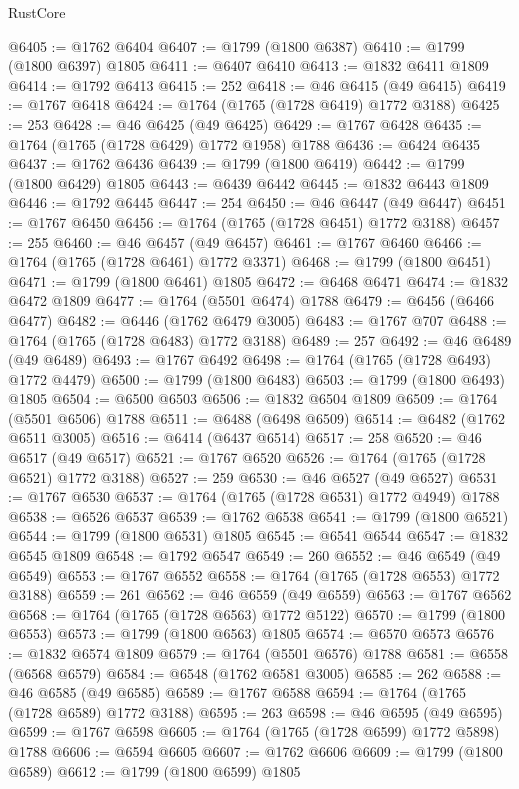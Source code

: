 \begin{lexlean}{RustCore}
\begin{coremodule}
@6405 := @1762 @6404
@6407 := @1799 (@1800 @6387)
@6410 := @1799 (@1800 @6397) @1805
@6411 := @6407 @6410
@6413 := @1832 @6411 @1809
@6414 := @1792 @6413
@6415 := 252
@6418 := @46 @6415 (@49 @6415)
@6419 := @1767 @6418
@6424 := @1764 (@1765 (@1728 @6419) @1772 @3188)
@6425 := 253
@6428 := @46 @6425 (@49 @6425)
@6429 := @1767 @6428
@6435 := @1764 (@1765 (@1728 @6429) @1772 @1958) @1788
@6436 := @6424 @6435
@6437 := @1762 @6436
@6439 := @1799 (@1800 @6419)
@6442 := @1799 (@1800 @6429) @1805
@6443 := @6439 @6442
@6445 := @1832 @6443 @1809
@6446 := @1792 @6445
@6447 := 254
@6450 := @46 @6447 (@49 @6447)
@6451 := @1767 @6450
@6456 := @1764 (@1765 (@1728 @6451) @1772 @3188)
@6457 := 255
@6460 := @46 @6457 (@49 @6457)
@6461 := @1767 @6460
@6466 := @1764 (@1765 (@1728 @6461) @1772 @3371)
@6468 := @1799 (@1800 @6451)
@6471 := @1799 (@1800 @6461) @1805
@6472 := @6468 @6471
@6474 := @1832 @6472 @1809
@6477 := @1764 (@5501 @6474) @1788
@6479 := @6456 (@6466 @6477)
@6482 := @6446 (@1762 @6479 @3005)
@6483 := @1767 @707
@6488 := @1764 (@1765 (@1728 @6483) @1772 @3188)
@6489 := 257
@6492 := @46 @6489 (@49 @6489)
@6493 := @1767 @6492
@6498 := @1764 (@1765 (@1728 @6493) @1772 @4479)
@6500 := @1799 (@1800 @6483)
@6503 := @1799 (@1800 @6493) @1805
@6504 := @6500 @6503
@6506 := @1832 @6504 @1809
@6509 := @1764 (@5501 @6506) @1788
@6511 := @6488 (@6498 @6509)
@6514 := @6482 (@1762 @6511 @3005)
@6516 := @6414 (@6437 @6514)
@6517 := 258
@6520 := @46 @6517 (@49 @6517)
@6521 := @1767 @6520
@6526 := @1764 (@1765 (@1728 @6521) @1772 @3188)
@6527 := 259
@6530 := @46 @6527 (@49 @6527)
@6531 := @1767 @6530
@6537 := @1764 (@1765 (@1728 @6531) @1772 @4949) @1788
@6538 := @6526 @6537
@6539 := @1762 @6538
@6541 := @1799 (@1800 @6521)
@6544 := @1799 (@1800 @6531) @1805
@6545 := @6541 @6544
@6547 := @1832 @6545 @1809
@6548 := @1792 @6547
@6549 := 260
@6552 := @46 @6549 (@49 @6549)
@6553 := @1767 @6552
@6558 := @1764 (@1765 (@1728 @6553) @1772 @3188)
@6559 := 261
@6562 := @46 @6559 (@49 @6559)
@6563 := @1767 @6562
@6568 := @1764 (@1765 (@1728 @6563) @1772 @5122)
@6570 := @1799 (@1800 @6553)
@6573 := @1799 (@1800 @6563) @1805
@6574 := @6570 @6573
@6576 := @1832 @6574 @1809
@6579 := @1764 (@5501 @6576) @1788
@6581 := @6558 (@6568 @6579)
@6584 := @6548 (@1762 @6581 @3005)
@6585 := 262
@6588 := @46 @6585 (@49 @6585)
@6589 := @1767 @6588
@6594 := @1764 (@1765 (@1728 @6589) @1772 @3188)
@6595 := 263
@6598 := @46 @6595 (@49 @6595)
@6599 := @1767 @6598
@6605 := @1764 (@1765 (@1728 @6599) @1772 @5898) @1788
@6606 := @6594 @6605
@6607 := @1762 @6606
@6609 := @1799 (@1800 @6589)
@6612 := @1799 (@1800 @6599) @1805

\end{coremodule}
\end{lexlean}
